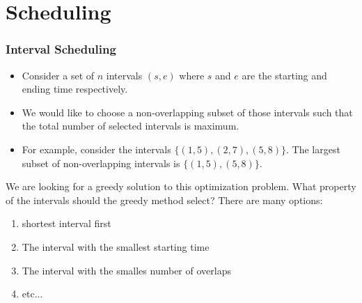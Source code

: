 \documentclass{beamer}
\begin{document}
\section{Scheduling}
\begin{frame}
  \frametitle{Interval Scheduling}
  \begin{itemize}
    \item Consider a set of $n$ intervals $(s,e)$ where $s$ and $e$ are the starting and ending time respectively.
    \item We would like to choose a non-overlapping subset of those intervals such that the total number of selected intervals is maximum.
    \item For example, consider the intervals $\{(1,5),(2,7),(5,8)\}$. The largest subset of non-overlapping intervals is $\{(1,5),(5,8)\}$. 

  \end{itemize}
    
We are looking for a greedy solution to this optimization problem. What property of the intervals should the greedy method select? There are many options:
\begin{enumerate}
  \item shortest interval first
  \item The interval with the smallest starting time
  \item The interval with the smalles number of overlaps 
  \item etc...
\end{enumerate}
\end{frame}
\end{document}

